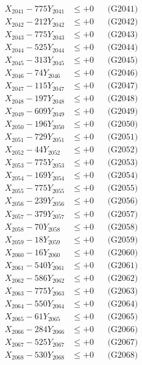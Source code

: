 \documentclass[a4paper,10pt]{article}
\begin{document}
{\begin{align}
\allowbreak
X_{2041} - 775Y_{2041} &\leq +0 && \text{(G2041)} \\
X_{2042} - 212Y_{2042} &\leq +0 && \text{(G2042)} \\
X_{2043} - 775Y_{2043} &\leq +0 && \text{(G2043)} \\
X_{2044} - 525Y_{2044} &\leq +0 && \text{(G2044)} \\
X_{2045} - 313Y_{2045} &\leq +0 && \text{(G2045)} \\
X_{2046} - 74Y_{2046} &\leq +0 && \text{(G2046)} \\
X_{2047} - 115Y_{2047} &\leq +0 && \text{(G2047)} \\
X_{2048} - 197Y_{2048} &\leq +0 && \text{(G2048)} \\
X_{2049} - 609Y_{2049} &\leq +0 && \text{(G2049)} \\
X_{2050} - 196Y_{2050} &\leq +0 && \text{(G2050)} \\
\allowbreak
X_{2051} - 729Y_{2051} &\leq +0 && \text{(G2051)} \\
X_{2052} - 44Y_{2052} &\leq +0 && \text{(G2052)} \\
X_{2053} - 775Y_{2053} &\leq +0 && \text{(G2053)} \\
X_{2054} - 169Y_{2054} &\leq +0 && \text{(G2054)} \\
X_{2055} - 775Y_{2055} &\leq +0 && \text{(G2055)} \\
X_{2056} - 239Y_{2056} &\leq +0 && \text{(G2056)} \\
X_{2057} - 379Y_{2057} &\leq +0 && \text{(G2057)} \\
X_{2058} - 70Y_{2058} &\leq +0 && \text{(G2058)} \\
X_{2059} - 18Y_{2059} &\leq +0 && \text{(G2059)} \\
X_{2060} - 16Y_{2060} &\leq +0 && \text{(G2060)} \\
\allowbreak
X_{2061} - 540Y_{2061} &\leq +0 && \text{(G2061)} \\
X_{2062} - 586Y_{2062} &\leq +0 && \text{(G2062)} \\
X_{2063} - 775Y_{2063} &\leq +0 && \text{(G2063)} \\
X_{2064} - 550Y_{2064} &\leq +0 && \text{(G2064)} \\
X_{2065} - 61Y_{2065} &\leq +0 && \text{(G2065)} \\
X_{2066} - 284Y_{2066} &\leq +0 && \text{(G2066)} \\
X_{2067} - 525Y_{2067} &\leq +0 && \text{(G2067)} \\
X_{2068} - 530Y_{2068} &\leq +0 && \text{(G2068)} \\

\end{align}}
\end{document}
